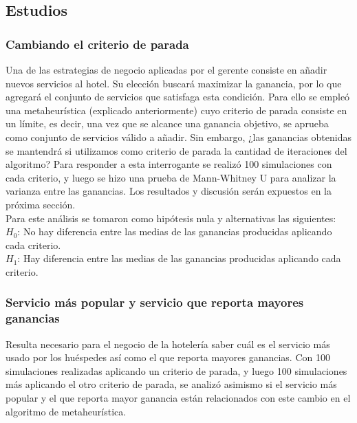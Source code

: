 \documentclass[12pt,a4paper]{article} \usepackage[spanish]{babel} \usepackage{graphicx} \usepackage{amsmath} \usepackage{amsfonts} \usepackage{amssymb} \usepackage{float} \usepackage{geometry}
\begin{document}
\subsection{Estudios}
\subsubsection{Cambiando el criterio de parada}
Una de las estrategias de negocio aplicadas por el gerente consiste en añadir nuevos servicios al hotel. Su elección buscará maximizar la ganancia, por lo que agregará el conjunto de servicios que satisfaga esta condición. Para ello se empleó una metaheurística (explicado anteriormente) cuyo criterio de parada consiste en un límite, es decir, una vez que se alcance una ganancia objetivo, se aprueba como conjunto de servicios válido a añadir. Sin embargo, ¿las ganancias obtenidas se mantendrá si utilizamos como criterio de parada la cantidad de iteraciones del algoritmo? Para responder a esta interrogante se realizó 100 simulaciones con cada criterio, y luego se hizo una prueba de Mann-Whitney U para analizar la varianza entre las ganancias. Los resultados y discusión serán expuestos en la próxima sección.\\
Para este análisis se tomaron como hipótesis nula y alternativas las siguientes:\\
$H_0$: No hay diferencia entre las medias de las ganancias producidas aplicando cada criterio.\\
$H_1$: Hay diferencia entre las medias de las ganancias producidas aplicando cada criterio.\\
\subsubsection{Servicio más popular y servicio que reporta mayores ganancias}
Resulta necesario para el negocio de la hotelería saber cuál es el servicio más usado por los huéspedes así como el que reporta mayores ganancias. Con 100 simulaciones realizadas aplicando un criterio de parada, y luego 100 simulaciones más aplicando el otro criterio de parada, se analizó asimismo si el servicio más popular y el que reporta mayor ganancia están relacionados con este cambio en el algoritmo de metaheurística.
\end{document}
